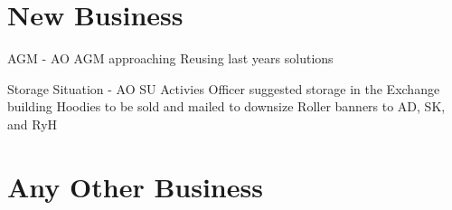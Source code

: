 \documentclass[11pt,hacksoc]{meetingmins}
\begin{document}
\section{New Business}
\begin{items}
\item AGM - AO
\subitem AGM approaching
\subitem Reusing last years solutions
\item Storage Situation - AO
\subitem SU Activies Officer suggested storage in the Exchange building
\subitem Hoodies to be sold and mailed to downsize
\subitem Roller banners to AD, SK, and RyH
\end{items}

\section{Any Other Business}

\vspace{1em}
\end{document}

